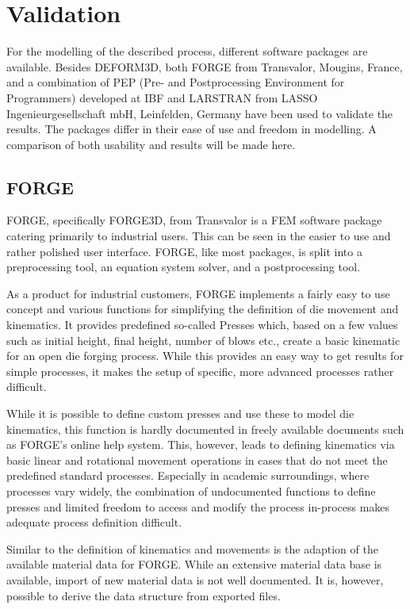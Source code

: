 \section{Validation}

For the modelling of the described process, different software packages are available. Besides DEFORM3D, both FORGE from Transvalor, Mougins, France, and a combination of PEP (Pre- and Postprocessing Environment for Programmers) developed at IBF and LARSTRAN from LASSO Ingenieurgesellschaft mbH, Leinfelden, Germany have been used to validate the results. The packages differ in their ease of use and freedom in modelling. A comparison of both usability and results will be made here.

\subsection{FORGE}
FORGE, specifically FORGE3D, from Transvalor is a FEM software package catering primarily to industrial users. This can be seen in the easier to use and rather polished user interface. FORGE, like most packages, is split into a preprocessing tool, an equation system solver, and a postprocessing tool.

As a product for industrial customers, FORGE implements a fairly easy to use concept and various functions for simplifying the definition of die movement and kinematics. It provides predefined so-called Presses which, based on a few values such as initial height, final height, number of blows etc., create a basic kinematic for an open die forging process. While this provides an easy way to get results for simple processes, it makes the setup of specific, more advanced processes rather difficult.

While it is possible to define custom presses and use these to model die kinematics, this function is hardly documented in freely available documents such as FORGE's online help system. This, however, leads to defining kinematics via basic linear and rotational movement operations in cases that do not meet the predefined standard processes. Especially in academic surroundings, where processes vary widely, the combination of undocumented functions to define presses and limited freedom to access and modify the process in-process makes adequate process definition difficult.

Similar to the definition of kinematics and movements is the adaption of the available material data for FORGE. While an extensive material data base is available, import of new material data is not well documented. It is, however, possible to derive the data structure from exported files.

